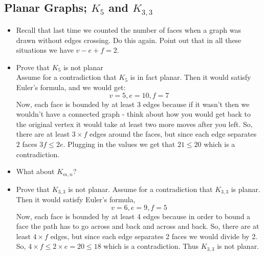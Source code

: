 \documentclass[12pt]{article}
\theoremstyle{plain}
\theoremstyle{definition}
\theoremstyle{remark}
\begin{document}
\subsection*{Planar Graphs; $K_5$ and $K_{3,3}$}
\begin{itemize}

\item Recall that last time we counted the number of faces when a graph was drawn without edges crossing.  Do this again.  Point out that in all these situations we have $v - e + f = 2$.




\item Prove that $K_5$ is not planar\\
Assume for a contradiction that $K_5$ is in fact planar. Then it would satisfy Euler's formula, and we would get:
\[v=5, e=10, f=7\]
Now, each face is bounded by at least 3 edges because if it wasn't then we wouldn't have a connected graph - think about how you would get back to the original vertex it would take at least two more moves after you left. So, there are at least $3\times f$ edges around the faces, but since each edge separates $2$ faces $3f\leq 2e$. Plugging in the values we get that $21\leq 20$ which is a contradiction.
\item What about $K_{m,n}$?
\item Prove that $K_{3,3}$ is not planar.
Assume for a contradiction that $K_{3,3}$ is planar. Then it would satisfy Euler's formula,
\[v=6, e=9, f=5\]
Now, each face is bounded by at least 4 edges because in order to bound a face the path has to go across and back and across and back. So, there are at least $4\times f$ edges, but since each edge separates 2 faces we would divide by 2. So, $4\times f \leq 2\times e= 20\leq 18$ which is a contradiction. Thus $K_{3,3}$ is not planar.


\end{itemize}
\end{document}

